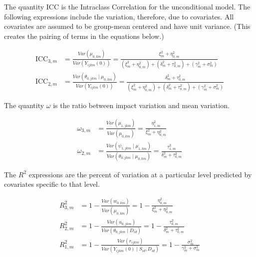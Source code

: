 \documentclass[12pt]{article}
\begin{document}
The quantity $\text{ICC}$ is the Intraclass Correlation for the unconditional model. The following expressions include the variation, therefore, due to covariates.  All covariates are assumed to be group-mean centered and have unit variance.  (This creates the pairing of terms in the equations below.)

\begin{align*}
\text{ICC}_{3,m} &= \frac{Var(\mu_{0,km})}{ Var(Y_{ijkm}(0))} = \frac{\xi^2_m + \eta_{0,m}^2}{\left(\xi_m^2 +  \eta^2_{0,m}\right) + \left(\delta_m^2  + \tau^2_{0,m}\right) + \left(\gamma_m^2 + \sigma^2_m\right)}\\
\text{ICC}_{2,m} &= \frac{Var(\theta_{0,jkm} \mid \mu_{0,km})}{ Var(Y_{ijkm}(0))} = \frac{\delta_m^2  + \tau_{0,m}^2}{ \left(\xi_m^2 +  \eta^2_{0,m}\right) + \left(\delta_m^2  + \tau^2_{0,m}\right) + \left(\gamma_m^2 + \sigma^2_m\right)}
\end{align*}

The quantity $\omega$ is the ratio between impact variation and mean variation.

\begin{align*}
\omega_{3,m} &=  \frac{Var(\mu_{1,jkm})}{Var(\mu_{0,km})} = \frac{\eta^2_{1,m}}{\xi^2_m + \eta_{0,m}^2}\\
\omega_{2,m} &=  \frac{Var(\psi_{1,jkm} \mid \mu_{1,km})}{Var(\theta_{0,jkm} \mid \mu_{0,km})} = \frac{\tau^2_{1,m}}{\delta_m^2 + \tau^2_{0,m}}
\end{align*}

The $R^2$ expressions are the percent of variation at a particular level predicted by covariates specific to that level.

\begin{align*}
R_{3,m}^2 &= 1 - \frac{Var(w_{0,km})}{Var(\mu_{0,km})} = 1 - \frac{\eta^2_{0,m}}{\xi_m^2 + \eta^2_{0,m}} \\
R_{2,m}^2 &= 1 - \frac{Var(u_{0,jkm})}{Var(\theta_{0,jkm} \mid D_{id})} = 1 - \frac{\tau^2_{0,m}}{\delta_m^2 + \tau^2_{0,m}}\\
R^2_{1,m} &= 1 - \frac{Var(r_{ijkm})}{Var( Y_{ijkm}(0) \mid S_{id}, D_{id})} = 1 - \frac{ \sigma^2_m }{ \gamma_m^2 + \sigma^2_m }
\end{align*}


\end{document}
